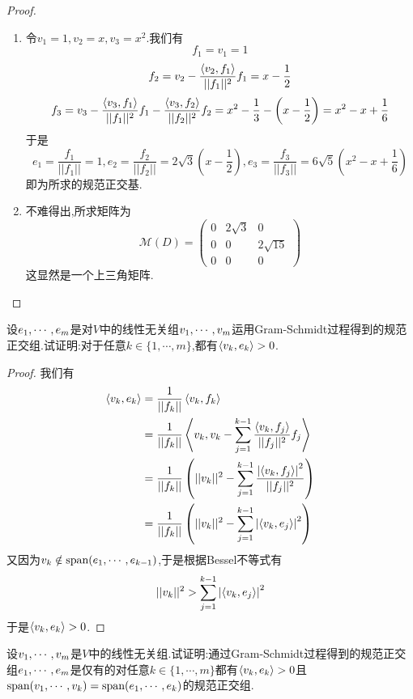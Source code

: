 \documentclass{ctexart}
\begin{document}
\begin{proof}
    \begin{enumerate}[label=\tbf{(\arabic*)}]
        \item 令$v_1=1,v_2=x,v_3=x^2$.我们有
            \[f_1=v_1=1\]
            \[f_2=v_2-\dfrac{\left\langle{v_2},{f_1}\right\rangle}{||f_1||^2}f_1=x-\dfrac12\]
            \[f_3=v_3-\dfrac{\left\langle{v_3},{f_1}\right\rangle}{||f_1||^2}f_1-\dfrac{\left\langle{v_3},{f_2}\right\rangle}{||f_2||^2}f_2=x^2-\dfrac{1}{3}-\left(x-\dfrac12\right)=x^2-x+\dfrac{1}{6}\]
            于是
            \[e_1=\dfrac{f_1}{||f_1||}=1,e_2=\dfrac{f_2}{||f_2||}=2\sqrt{3}\left(x-\dfrac{1}{2}\right),e_3=\dfrac{f_3}{||f_3||}=6\sqrt{5}\left(x^2-x+\dfrac{1}{6}\right)\]
            即为所求的规范正交基.
        \item 不难得出,所求矩阵为
            \[\mathcal{M}(D)=\begin{pmatrix}
                0&2\sqrt{3}&0\\
                0&0&2\sqrt{15}\\
                0&0&0
            \end{pmatrix}\]
            这显然是一个上三角矩阵.
    \end{enumerate}
\end{proof}
\begin{problem}[9.]
    设${e}_1,\cdots,{e}_{m}$是对$V$中的线性无关组${v}_1,\cdots,{v}_{m}$运用Gram-Schmidt过程得到的规范正交组.试证明:对于任意$k\in\{1,\cdots,m\}$,都有$\left\langle{v_k},{e_k}\right\rangle>0$.
\end{problem}
\begin{proof}
    我们有
    \[\begin{aligned}
        \left\langle{v_k},{e_k}\right\rangle
        &= \dfrac{1}{||f_k||}\left\langle{v_k},{f_k}\right\rangle \\
        &= \dfrac{1}{||f_k||}\left\langle{v_k},{v_k-\sum_{j=1}^{k-1}\dfrac{\left\langle{v_k},{f_j}\right\rangle}{||f_j||^2}f_j}\right\rangle \\
        &= \dfrac{1}{||f_k||}\left(||v_k||^2-\sum_{j=1}^{k-1}\dfrac{\left|\left\langle{v_k},{f_j}\right\rangle\right|^2}{||f_j||^2}\right) \\
        &= \dfrac{1}{||f_k||}\left(||v_k||^2-\sum_{j=1}^{k-1}\left|\left\langle{v_k},{e_j}\right\rangle\right|^2\right)
    \end{aligned}\]
    又因为$v_k\notin\text{span}({e}_1,\cdots,{e}_{k-1})$,于是根据Bessel不等式有
    \[||v_k||^2>\sum_{j=1}^{k-1}\left|\left\langle{v_k},{e_j}\right\rangle\right|^2\]
    于是$\left\langle{v_k},{e_k}\right\rangle>0$.
\end{proof}
\begin{problem}[10.]
    设${v}_1,\cdots,{v}_{m}$是$V$中的线性无关组.试证明:通过Gram-Schmidt过程得到的规范正交组${e}_1,\cdots,{e}_{m}$是仅有的对任意$k\in\{1,\cdots,m\}$都有$\left\langle{v_k},{e_k}\right\rangle>0$且$\text{span}({v}_1,\cdots,{v}_{k})=\text{span}({e}_1,\cdots,{e}_{k})$的规范正交组.
\end{problem}
\end{document}
